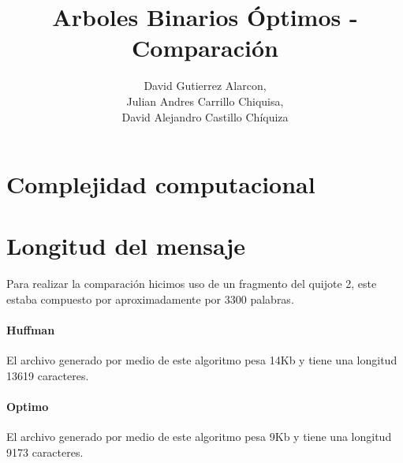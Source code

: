 \documentclass[10pt,letterpaper]{article}
\title{Arboles Binarios Óptimos - Comparación}
\author{David Gutierrez Alarcon,\\ Julian Andres Carrillo Chiquisa,\\ David Alejandro Castillo Chíquiza}
\begin{document}
\maketitle

\part*{Complejidad computacional}
	

\part*{Longitud del mensaje}
Para realizar la comparación hicimos uso de un fragmento del quijote 2, este estaba compuesto por aproximadamente por 3300 palabras.

	\subsection*{Huffman}

	El archivo generado por medio de este algoritmo pesa 14Kb y tiene una longitud 13619 caracteres.

	\subsection*{Optimo}
	
	El archivo generado por medio de este algoritmo pesa 9Kb y tiene una longitud 9173 caracteres.
	
	
\end{document}
